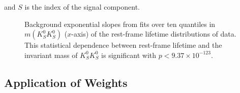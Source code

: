 and $S$ is the index of the signal component.


\begin{figure}
  \begin{center}
    
  \end{center}
  \caption{Background exponential slopes from fits over ten quantiles in $m(K_S^0K_S^0)$ ($x$-axis) of the rest-frame lifetime distributions of data. This statistical dependence between rest-frame lifetime and the invariant mass of $K_S^0K_S^0$ is significant with $p < 9.37\times 10^{-123}$.}\label{fig:factorization}
\end{figure}



\subsection{Application of Weights}\label{sec:application-of-weights}

